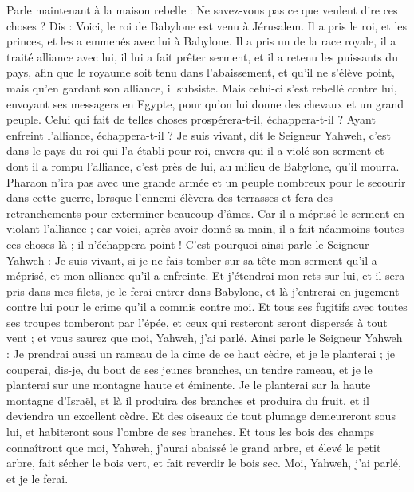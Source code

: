 \begin{multicols}{2}
Parle maintenant à la maison rebelle : Ne savez-vous pas ce que veulent dire ces choses ? Dis : Voici, le roi de Babylone est venu à Jérusalem. Il a pris le roi, et les princes, et les a emmenés avec lui à Babylone.
Il a pris un de la race royale, il a traité alliance avec lui, il lui a fait prêter serment, et il a retenu les puissants du pays,
afin que le royaume soit tenu dans l'abaissement, et qu'il ne s'élève point, mais qu'en gardant son alliance, il subsiste.
Mais celui-ci s'est rebellé contre lui, envoyant ses messagers en Egypte, pour qu'on lui donne des chevaux et un grand peuple. Celui qui fait de telles choses prospérera-t-il, échappera-t-il ? Ayant enfreint l'alliance, échappera-t-il ?
Je suis vivant, dit le Seigneur Yahweh, c'est dans le pays du roi qui l'a établi pour roi, envers qui il a violé son serment et dont il a rompu l'alliance, c'est près de lui, au milieu de Babylone, qu'il mourra.
Pharaon n'ira pas avec une grande armée et un peuple nombreux pour le secourir dans cette guerre, lorsque l'ennemi élèvera des terrasses et fera des retranchements pour exterminer beaucoup d'âmes.
Car il a méprisé le serment en violant l'alliance ; car voici, après avoir donné sa main, il a fait néanmoins toutes ces choses-là ; il n'échappera point !
C'est pourquoi ainsi parle le Seigneur Yahweh : Je suis vivant, si je ne fais tomber sur sa tête mon serment qu'il a méprisé, et mon alliance qu'il a enfreinte.
Et j'étendrai mon rets sur lui, et il sera pris dans mes filets, je le ferai entrer dans Babylone, et là j'entrerai en jugement contre lui pour le crime qu'il a commis contre moi.
Et tous ses fugitifs avec toutes ses troupes tomberont par l'épée, et ceux qui resteront seront dispersés à tout vent ; et vous saurez que moi, Yahweh, j'ai parlé.
Ainsi parle le Seigneur Yahweh : Je prendrai aussi un rameau de la cime de ce haut cèdre, et je le planterai ; je couperai, dis-je, du bout de ses jeunes branches, un tendre rameau, et je le planterai sur une montagne haute et éminente.
Je le planterai sur la haute montagne d'Israël, et là il produira des branches et produira du fruit, et il deviendra un excellent cèdre. Et des oiseaux de tout plumage demeureront sous lui, et habiteront sous l'ombre de ses branches.
Et tous les bois des champs connaîtront que moi, Yahweh, j'aurai abaissé le grand arbre, et élevé le petit arbre, fait sécher le bois vert, et fait reverdir le bois sec. Moi, Yahweh, j'ai parlé, et je le ferai.

\end{multicols}
